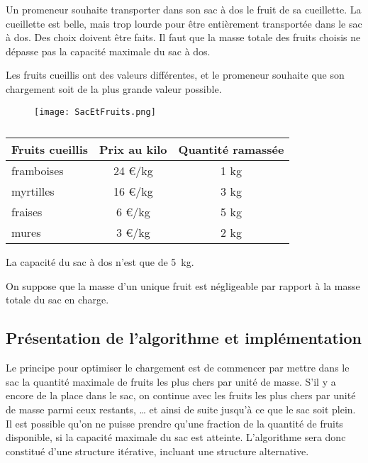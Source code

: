 \setcounter{numques}{0}

Un promeneur souhaite transporter dans son sac à dos le fruit de sa cueillette. La cueillette est belle, mais trop lourde pour être entièrement transportée dans le sac à dos. Des choix doivent être faits. Il faut que la masse totale des fruits choisis ne dépasse pas la capacité maximale du sac à dos.

Les fruits cueillis ont des valeurs différentes, et le promeneur souhaite que son chargement soit de la plus grande valeur possible.

\begin{figure}[h]
\centering
\texttt{[image: SacEtFruits.png]}
\label{fig:SacEtFruits}
\end{figure}



\begin{table}[h]
\centering
\begin{tabular}{|l|c|c|}
\hline
Fruits cueillis	& Prix au kilo & Quantité ramassée\\
\hline
framboises& 24 €/kg  & 1 kg \\
myrtilles & 16 €/kg & 3 kg  \\
fraises & 6 €/kg & 5 kg \\
mures & 3 €/kg & 2 kg \\
\hline
\end{tabular}
\caption{}
\end{table}

La capacité du sac à dos n’est que de \SI{5}{kg}.

On suppose que la masse d’un unique fruit est négligeable par rapport à la masse totale du sac en charge.

\subsection{Présentation de l’algorithme et implémentation}
\label{sec:PrésentationDeLAlgorithmeEtImplémentation}

Le principe pour optimiser le chargement est de commencer par mettre dans le sac la quantité maximale de fruits les plus chers par unité de masse. S’il y a encore de la place dans le sac, on continue avec les fruits les plus chers par unité de masse parmi ceux restants, … et ainsi de suite jusqu’à ce que le sac soit plein. Il est possible qu’on ne puisse prendre qu’une fraction de la quantité de fruits disponible, si la capacité maximale du sac est atteinte. L’algorithme sera donc constitué d’une structure itérative, incluant une structure alternative.

